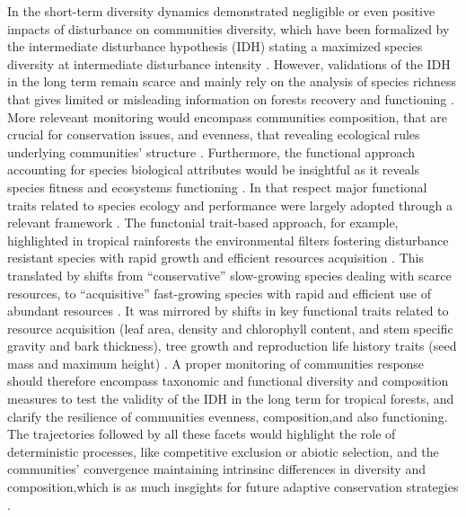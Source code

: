 \documentclass[fleqn,10pt]{ArtEcoFoG} %
\theoremstyle{definition}
\theoremstyle{definition}
\theoremstyle{definition}
\theoremstyle{remark}
\begin{document}
In the short-term diversity dynamics demonstrated negligible or even
positive impacts of disturbance on communities diversity, which have
been formalized by the intermediate disturbance hypothesis (IDH) stating
a maximized species diversity at intermediate disturbance intensity
\citep{Molino2001, Kariuki2006a, Berry2008a}. However, validations of
the IDH in the long term remain scarce and mainly rely on the analysis
of species richness that gives limited or misleading information on
forests recovery and functioning \citep{Martin2015, Chaudhary2016}. More
releveant monitoring would encompass communities composition, that are
crucial for conservation issues, and evenness, that revealing ecological
rules underlying communities' structure
\citep{Magurran1988, Lavorel2002, Bellwood2006}. Furthermore, the
functional approach accounting for species biological attributes would
be insightful as it reveals species fitness and ecosystems functioning
\citep{Violle2007b, Moretti2009, Baraloto2012a, Scheiter2013}. In that
respect major functional traits related to species ecology and
performance were largely adopted through a relevant framework
\citep{Diaz2005, Villeger2008a}. The functonial trait-based approach,
for example, highlighted in tropical rainforests the environmental
filters fostering disturbance resistant species with rapid growth and
efficient resources acquisition \citep{Molino2001, Haddad2008}. This
translated by shifts from ``conservative'' slow-growing species dealing
with scarce resources, to ``acquisitive'' fast-growing species with
rapid and efficient use of abundant resources
\citep{TerSteege2001, Reich2014, Herault2011}. It was mirrored by shifts
in key functional traits related to resource acquisition (leaf area,
density and chlorophyll content, and stem specific gravity and bark
thickness), tree growth and reproduction life history traits (seed mass
and maximum height) \citep{Wright2004, Westoby2006a, Chave2009b}. A
proper monitoring of communities response should therefore encompass
taxonomic and functional diversity and composition measures to test the
validity of the IDH in the long term for tropical forests, and clarify
the resilience of communities evenness, composition,and also
functioning. The trajectories followed by all these facets would
highlight the role of deterministic processes, like competitive
exclusion or abiotic selection, and the communities' convergence
maintaining intrinsinc differences in diversity and composition,which is
as much insgights for future adaptive conservation strategies
\citep{Adler2007}.
\end{document}
